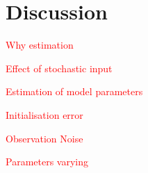 \documentclass{article}%
\newcommand\red{\textcolor{red}}
\begin{document}
\section{Discussion}

\red{Why estimation}

\red{Effect of stochastic input}

\red{Estimation of model parameters}

\red{Initialisation error}

\red{Observation Noise}

\red{Parameters varying}

% 
% 
% 
% 
% 
% 



\end{document}
